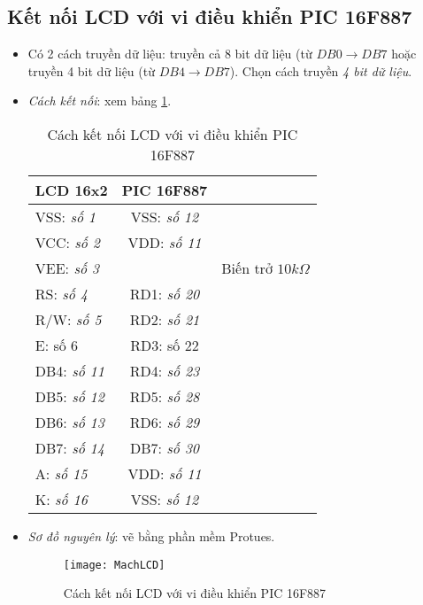 \subsection{Kết nối LCD với vi điều khiển PIC 16F887}
\begin{itemize}
\item Có 2 cách truyền dữ liệu: truyền cả 8 bit dữ liệu (từ $DB0 \rightarrow DB7$ hoặc truyền 4 bit dữ liệu (từ $DB4 \rightarrow DB7$). Chọn cách truyền \textit{4 bit dữ liệu}.
\item \textit{Cách kết nối}: xem bảng \ref{conLCD}.
\newpage
\begin{table}[!h]
\begin{center}
\begin{tabular}{|l|c|c|}\hline
\textbf{LCD 16x2} & \textbf{PIC 16F887} & \\ \hline
VSS: \textit{số 1} & VSS: \textit{số 12} & \\ \hline
VCC: \textit{số 2} & VDD: \textit{số 11} & \\ \hline
VEE: \textit{số 3} & & Biến trở $10k\Omega$ \\ \hline
RS: \textit{số 4} & RD1: \textit{số 20} & \\ \hline
R/W: \textit{số 5} & RD2: \textit{số 21} & \\ \hline
E: số 6 & RD3: số 22 & \\ \hline
DB4: \textit{số 11} & RD4: \textit{số 23} & \\ \hline
DB5: \textit{số 12} & RD5: \textit{số 28} & \\ \hline
DB6: \textit{số 13} & RD6: \textit{số 29} & \\ \hline
DB7: \textit{số 14} & DB7: \textit{số 30} & \\ \hline
A: \textit{số 15} & VDD: \textit{số 11} & \\ \hline
K: \textit{số 16} & VSS: \textit{số 12} & \\ \hline
\end{tabular}
\end{center}
\caption{Cách kết nối LCD với vi điều khiển PIC 16F887} \label{conLCD}
\end{table}
\item \textit{Sơ đồ nguyên lý}: vẽ bằng phần mềm Protues.
\begin{figure}[h]
\begin{center}
\texttt{[image: MachLCD]}
\end{center}
\caption{Cách kết nối LCD với vi điều khiển PIC 16F887}
\end{figure}
\end{itemize}

